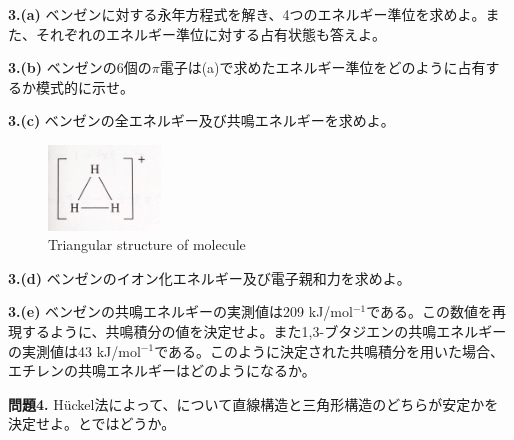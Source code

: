 \documentclass[12pt,pra,aps]{revtex4}
\begin{document}
\noindent
{\bf 3.(a)} ベンゼンに対する永年方程式を解き、4つのエネルギー準位を求めよ。また、それぞれのエネルギー準位に対する占有状態も答えよ。

\noindent
{\bf 3.(b)} ベンゼンの6個の$\pi$電子は(a)で求めたエネルギー準位をどのように占有するか模式的に示せ。

\noindent
{\bf 3.(c)} ベンゼンの全エネルギー及び共鳴エネルギーを求めよ。

\begin{figure}
  \centering
  \includegraphics[width=3.0cm]{triangle.jpg}
  \caption{Triangular structure of  molecule}
\end{figure}

\noindent
{\bf 3.(d)} ベンゼンのイオン化エネルギー及び電子親和力を求めよ。

\noindent
{\bf 3.(e)} ベンゼンの共鳴エネルギーの実測値は209 kJ/mol${}^{-1}$である。この数値を再現するように、共鳴積分の値を決定せよ。また1,3-ブタジエンの共鳴エネルギーの実測値は43 kJ/mol${}^{-1}$である。このように決定された共鳴積分を用いた場合、エチレンの共鳴エネルギーはどのようになるか。

\noindent
{\bf 問題4.} H\"uckel法によって、について直線構造と三角形構造のどちらが安定かを決定せよ。とではどうか。
\end{document}
